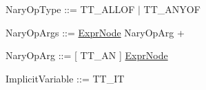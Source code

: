 \begin{DoxyParagraph}{}
Nary\-Op\-Type \-:\-:= {\ttfamily T\-T\-\_\-\-A\-L\-L\-O\-F} $|$ {\ttfamily T\-T\-\_\-\-A\-N\-Y\-O\-F} 
\end{DoxyParagraph}
\begin{DoxyParagraph}{}
Nary\-Op\-Args \-:\-:= \hyperlink{struct_expr_node}{Expr\-Node} Nary\-Op\-Arg +
\end{DoxyParagraph}
\begin{DoxyParagraph}{}
Nary\-Op\-Arg \-:\-:= \mbox{[} {\ttfamily T\-T\-\_\-\-A\-N} \mbox{]} \hyperlink{struct_expr_node}{Expr\-Node}
\end{DoxyParagraph}
\begin{DoxyParagraph}{}
Implicit\-Variable \-:\-:= {\ttfamily T\-T\-\_\-\-I\-T} 
\end{DoxyParagraph}
